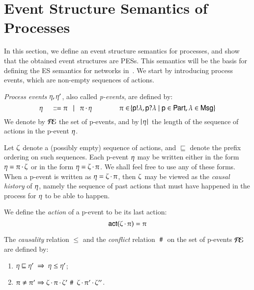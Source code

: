 

\section{Event Structure Semantics of Processes}

In this section, we define an event structure semantics for processes,
and show that the obtained event structures are PESs.  This semantics
will be the basis for defining the ES semantics for networks
in~.  We start by introducing process
events, which are non-empty sequences of actions.


\begin{definition}
{\em Process events} $\eta,
  \eta'$,  also called \emph{p-events},  are defined by: 
\[\eta \ \quad ::= \pi ~~ \mid~~
    {\pi}\,{\cdot}\,\eta \qquad\qquad \pi \in \!
    \{{\sf p}!\lambda, {\sf p}?\lambda 
      \mid {\sf p}\in {\sf Part}, \lambda \in {\sf Msg}\}\]
We denote by $\mathcal{P\!E}$ the set of  p-events, and by
$\!\!~|~\! \eta\!~|~\!$ the length of the sequence of actions in
the p-event $\eta$. 
\end{definition}
%

Let $\zeta$ denote a (possibly empty) sequence of actions, and
$\sqsubseteq$ denote the prefix ordering on such sequences.  Each
 p-event  $\eta$ may be written either in the form $\eta = \pi\,{\cdot}\,\zeta$ or in the form $\eta =
\zeta\,{\cdot}\,\pi$. We shall feel free to use any of these forms. 
When a  p-event  is written as $\eta = \zeta\,{\cdot}\,\pi $,
then $\zeta$ may be viewed as the \emph{causal history} of
$\eta$, namely the sequence of past actions that must have happened
in the process for $\eta$ to be able to happen. 

We define the  \emph{action}  of a  p-event   to be
its last action: 
\[
\sf act(\zeta\,{\cdot}\,\pi) = \pi
\]


\begin{definition} %
The \emph{causality} relation $\leq$ and the \emph{conflict} relation
$~\#~$ on the set of  p-events  $\mathcal{P\!E}$ are defined by:
\begin{enumerate}
\item {} 
$\procev \sqsubseteq \procev' \ \impl \ \procev\precP\procev'$;\smallskip
\item {} 
  $\pi\neq\pi'  \Rightarrow
  \zeta\,{\cdot}\,\pi\,{\cdot}\,\zeta'\,\,\#\,\,\,\zeta\,{\cdot}\,\pi'\,{\cdot}\,\zeta''$.
\end{enumerate}
\end{definition}
%


